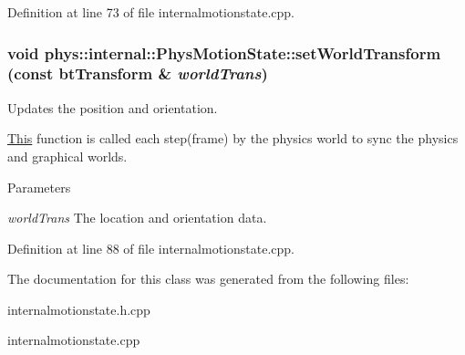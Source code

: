 Definition at line 73 of file internalmotionstate.cpp.

\hypertarget{classphys_1_1internal_1_1PhysMotionState_a1fe29e3e661cdbbfb846fbd0ac91ec37}{
\subsubsection[{setWorldTransform}]{\setlength{\rightskip}{0pt plus 5cm}void phys::internal::PhysMotionState::setWorldTransform (const btTransform \& {\em worldTrans})}}
\label{dc/df8/classphys_1_1internal_1_1PhysMotionState_a1fe29e3e661cdbbfb846fbd0ac91ec37}


Updates the position and orientation. 

\hyperlink{structThis}{This} function is called each step(frame) by the physics world to sync the physics and graphical worlds. 
\begin{DoxyParams}{Parameters}
\item[{\em worldTrans}]The location and orientation data. \end{DoxyParams}


Definition at line 88 of file internalmotionstate.cpp.



The documentation for this class was generated from the following files:\begin{DoxyCompactItemize}
\item 
internalmotionstate.h.cpp\item 
internalmotionstate.cpp\end{DoxyCompactItemize}
